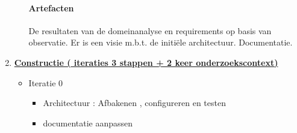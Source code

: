 \begin{enumerate}
\begin{itemize}
		\paragraph{Artefacten}
		De resultaten van de domeinanalyse en requirements op basis van observatie.
		Er is een visie m.b.t. de initi\"ele architectuur.
		Documentatie.
		\end{itemize}

\item \underline{\textbf{Constructie ({ iteraties} 3 stappen + 2 keer onderzoekscontext)}}
	\begin{itemize}
	\item Iteratie 0
		\begin{itemize}
		\item Architectuur : Afbakenen , configureren en testen
		\item documentatie aanpassen
		\end{itemize}

\end{itemize}
\end{enumerate}
